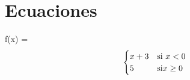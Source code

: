 \documentclass{article}
\begin{document}
\section{Ecuaciones}
f(x) =
$$\begin{cases}
x+3 & \text{si $ x < 0$ }\\
5 & \text{si$x \geq 0$}
\end{cases}$$  
\end{document}
